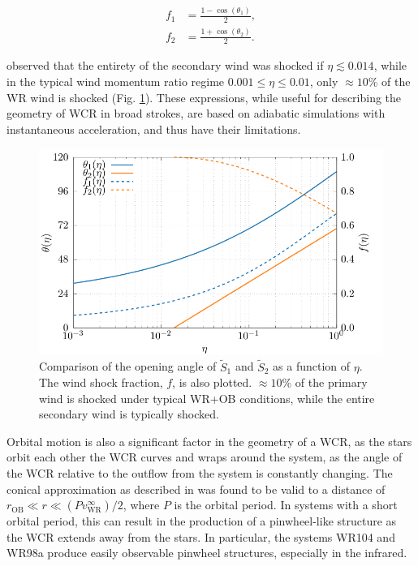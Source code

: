 \begin{subequations}
  \label{eq:windshockfraction}
  \begin{align}
    f_1 & = \frac{1 - \cos\left(\theta_1\right)}{2} , \\
    f_2 & = \frac{1 + \cos\left(\theta_2\right)}{2} .
  \end{align}
\end{subequations}

\noindent
\textcite{pittardCollidingStellarWinds2018} observed that the entirety of the secondary wind was shocked if $\eta \lesssim 0.014$, while in the typical wind momentum ratio regime $0.001 \leq \eta \leq 0.01$, only $\approx 10\%$ of the WR wind is shocked (Fig. \ref{fig:wind-shock-factor}).
These expressions, while useful for describing the geometry of WCR in broad strokes, are based on adiabatic simulations with instantaneous acceleration, and thus have their limitations.

\begin{figure}[h]
  \centering
  \includegraphics[]{assets/wind-shock-factor/shock-factor.pdf}
  \caption[Wind shock fraction, as a function of $\eta$]{Comparison of the opening angle of $\widetilde{S}_1$ and $\widetilde{S}_2$ as a function of $\eta$. The wind shock fraction, $f$, is also plotted. $\approx 10\%$ of the primary wind is shocked under typical WR+OB conditions, while the entire secondary wind is typically shocked.}
  \label{fig:wind-shock-factor}
\end{figure}

Orbital motion is also a significant factor in the geometry of a WCR, as the stars orbit each other the WCR curves and wraps around the system, as the angle of the WCR relative to the outflow from the system is constantly changing.
The conical approximation as described in \textcite{eichler_particle_1993} was found to be valid to a distance of $r_\text{OB} \ll r \ll (P v^\infty_\text{WR})/2$, where $P$ is the orbital period.
In systems with a short orbital period, this can result in the production of a pinwheel-like structure as the WCR extends away from the stars.
In particular, the systems WR104 and WR98a produce easily observable pinwheel structures, especially in the infrared.

